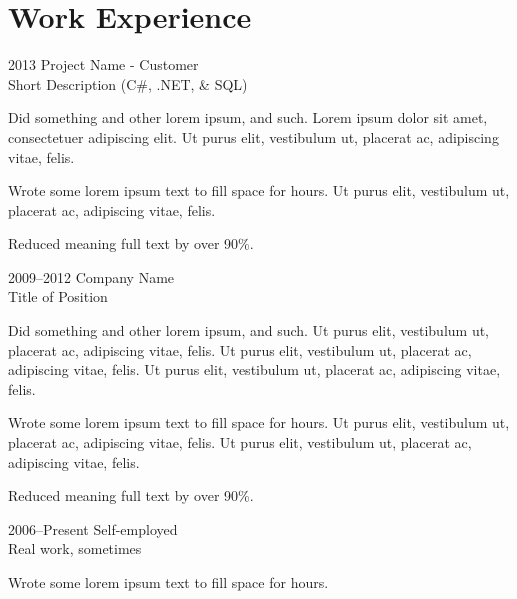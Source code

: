\documentclass[10pt]{article}
\begin{document}
  \section*{Work Experience}
  
    \begin{CvBlockEnv}
      {2013}
      {Project Name - Customer \\ Short Description (C\#, .NET, \& SQL)}
        \begin{citemize}
          \item Did something and other lorem ipsum, and such. Lorem ipsum dolor sit amet, consectetuer adipiscing elit. Ut purus elit, vestibulum ut, placerat ac, adipiscing vitae, felis.
          \item Wrote some lorem ipsum text to fill space for hours. Ut purus elit, vestibulum ut, placerat ac, adipiscing vitae, felis.
          \item Reduced meaning full text by over 90\%.
        \end{citemize}
    \end{CvBlockEnv}
    
    \begin{CvBlockEnv}
      {2009--2012}
      {Company Name \\ Title of Position}
        \begin{citemize}
          \item Did something and other lorem ipsum, and such. Ut purus elit, vestibulum ut, placerat ac, adipiscing vitae, felis. Ut purus elit, vestibulum ut, placerat ac, adipiscing vitae, felis. Ut purus elit, vestibulum ut, placerat ac, adipiscing vitae, felis.
          \item Wrote some lorem ipsum text to fill space for hours. Ut purus elit, vestibulum ut, placerat ac, adipiscing vitae, felis. Ut purus elit, vestibulum ut, placerat ac, adipiscing vitae, felis.
          \item Reduced meaning full text by over 90\%.
        \end{citemize}%
    \end{CvBlockEnv}
    
    \begin{CvBlockEnv}
      {2006--Present}
      {Self-employed \\ Real work, sometimes}
        \begin{citemize}
          \item Wrote some lorem ipsum text to fill space for hours.
        \end{citemize}
    \end{CvBlockEnv}
  
\end{document}
